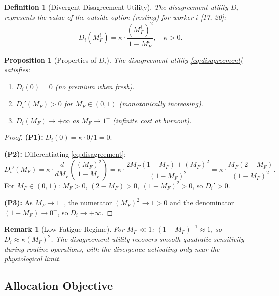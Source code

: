 \documentclass[11pt,a4paper]{article}
\newtheorem{proposition}[theorem]{Proposition}
\newtheorem{definition}[theorem]{Definition}
\newtheorem{remark}[theorem]{Remark}
\begin{document}
\begin{definition}[Divergent Disagreement Utility]
The disagreement utility $D_i$ represents the value of the outside
option (resting) for worker $i$ [17, 20]:
\begin{equation}\label{eq:disagreement}
D_i(M_F^i) = \kappa \cdot \frac{(M_F^i)^2}{1 - M_F^i}, \quad \kappa > 0.
\end{equation}
\end{definition}

\begin{proposition}[Properties of $D_i$]\label{prop:disagreement}
The disagreement utility \eqref{eq:disagreement} satisfies:
\begin{enumerate}[label=(P\arabic*),noitemsep]
\item $D_i(0) = 0$ (no premium when fresh).
\item $D_i'(M_F) > 0$ for $M_F \in (0, 1)$ (monotonically increasing).
\item $D_i(M_F) \to +\infty$ as $M_F \to 1^-$ (infinite cost at burnout).
\end{enumerate}
\end{proposition}

\begin{proof}
\textbf{(P1):} $D_i(0) = \kappa \cdot 0/1 = 0$. \checkmark

\textbf{(P2):} Differentiating \eqref{eq:disagreement}:
\[
D_i'(M_F) = \kappa \cdot \frac{d}{dM_F}\left(\frac{(M_F)^2}{1 - M_F}\right) = \kappa \cdot \frac{2 M_F (1 - M_F) + (M_F)^2}{(1 - M_F)^2} = \kappa \cdot \frac{M_F (2 - M_F)}{(1 - M_F)^2}.
\]
For $M_F \in (0, 1)$: $M_F > 0$, $(2 - M_F) > 0$, $(1 - M_F)^2 > 0$,
so $D_i' > 0$. \checkmark

\textbf{(P3):} As $M_F \to 1^-$, the numerator $(M_F)^2 \to 1 > 0$
and the denominator $(1 - M_F) \to 0^+$, so $D_i \to +\infty$. \checkmark
\end{proof}

\begin{remark}[Low-Fatigue Regime]
For $M_F \ll 1$: $(1 - M_F)^{-1} \approx 1$, so $D_i \approx \kappa
(M_F)^2$. The disagreement utility recovers smooth quadratic
sensitivity during routine operations, with the divergence activating
only near the physiological limit.
\end{remark}

\subsection{Allocation Objective}
\end{document}

